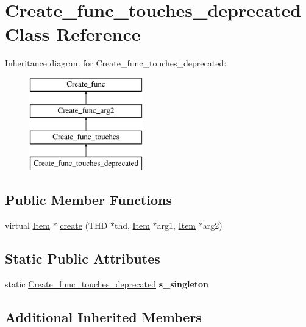 \hypertarget{classCreate__func__touches__deprecated}{}\section{Create\+\_\+func\+\_\+touches\+\_\+deprecated Class Reference}
\label{classCreate__func__touches__deprecated}
Inheritance diagram for Create\+\_\+func\+\_\+touches\+\_\+deprecated\+:\begin{figure}[H]
\begin{center}
\leavevmode
\includegraphics[height=4.000000cm]{classCreate__func__touches__deprecated}
\end{center}
\end{figure}
\subsection*{Public Member Functions}
\begin{DoxyCompactItemize}
\item 
virtual \mbox{\hyperlink{classItem}{Item}} $\ast$ \mbox{\hyperlink{classCreate__func__touches__deprecated_ac31bba997228e240ece5c9172f7ad010}{create}} (T\+HD $\ast$thd, \mbox{\hyperlink{classItem}{Item}} $\ast$arg1, \mbox{\hyperlink{classItem}{Item}} $\ast$arg2)
\end{DoxyCompactItemize}
\subsection*{Static Public Attributes}
\begin{DoxyCompactItemize}
\item 
\mbox{\label{classCreate__func__touches__deprecated_a111963df379e96a20ffe0019f0ccea18}} 
static \mbox{\hyperlink{classCreate__func__touches__deprecated}{Create\+\_\+func\+\_\+touches\+\_\+deprecated}} {\bfseries s\+\_\+singleton}
\end{DoxyCompactItemize}
\subsection*{Additional Inherited Members}


